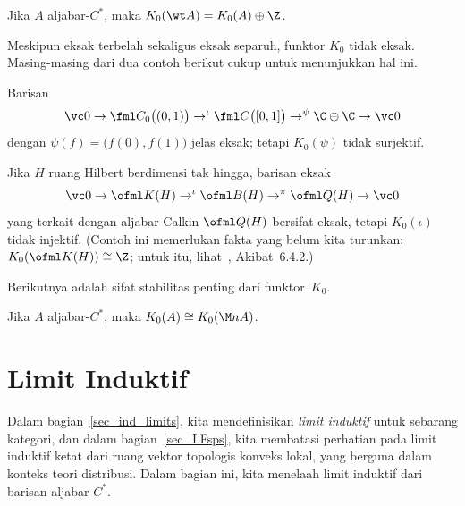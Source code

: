 \begin{exam}\label{0062674} Jika $A$ aljabar-$C^*$, maka $K_0(\wt A) = K_0(A) \oplus \Z$.
\end{exam}

Meskipun eksak terbelah sekaligus eksak separuh, funktor $K_0$ tidak eksak. Masing-masing dari dua
contoh berikut cukup untuk menunjukkan hal ini.

\begin{exam}\label{0062677} Barisan
   \[ \vc 0 \to \fml C_0\bigl((0,1)\bigr) \to^\iota \fml C\bigl([0,1]\bigr)
                               \to^\psi \C \oplus \C \to \vc 0 \]
dengan $\psi(f) = \bigl(f(0),f(1)\bigr)$ jelas eksak; tetapi $K_0(\psi)$ tidak surjektif.
\end{exam}

\begin{exam}\label{0062679} Jika $H$ ruang Hilbert berdimensi tak hingga, barisan eksak %
  \[ \vc 0 \to \ofml K(H) \to^\iota \ofml B(H) \to^\pi \ofml Q(H) \to \vc 0 \]
yang terkait dengan aljabar Calkin $\ofml Q(H)$ bersifat eksak, tetapi $K_0(\iota)$ tidak injektif.
(Contoh ini memerlukan fakta yang belum kita turunkan: $K_0(\ofml K(H)) \cong \Z$; untuk itu, lihat~\cite{RordamLL:2000}, Akibat~6.4.2.)
\end{exam}

Berikutnya adalah sifat stabilitas penting dari funktor~$K_0$.
\begin{prop}\label{0062681} Jika $A$ aljabar-$C^*$, maka $K_0(A) \cong K_0(\M nA)$.
\end{prop}






















\section{Limit Induktif}
Dalam bagian~\ref{sec_ind_limits}, kita mendefinisikan \emph{limit induktif} untuk sebarang kategori, dan dalam
bagian~\ref{sec_LFsps}, kita membatasi perhatian pada limit induktif ketat dari ruang vektor topologis
konveks lokal, yang berguna dalam konteks teori distribusi. Dalam bagian
ini, kita menelaah limit induktif dari barisan aljabar-$C^*$.

